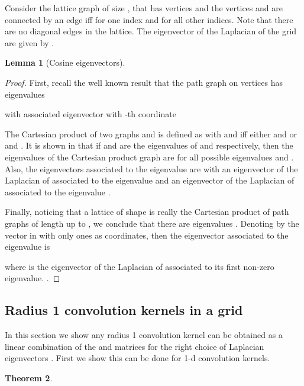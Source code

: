 \documentclass{article} \usepackage{arxiv,times}
\newtheorem{theorem}{Theorem}[section]
\newtheorem{lemma}[theorem]{Lemma}
\begin{document}
Consider the lattice graph  of size , that has vertices  and the vertices  and  are connected by an edge iff  for one index  and  for all other indices. Note that there are no diagonal edges in the lattice. The eigenvector of the Laplacian of the grid  are given by .

\begin{lemma}[Cosine eigenvectors]
\label{lemma:cosine_eigvec}
\end{lemma}


\begin{proof}
First, recall the well known result that the path graph on  vertices  has eigenvalues 

with associated eigenvector  with -th coordinate


The Cartesian product of two graphs  and  is defined as  with  and  iff either  and  or  and . It is shown in \cite{fiedler1973algebraic} that if  and  are the eigenvalues of  and  respectively, then the eigenvalues of the Cartesian product graph  are  for all possible eigenvalues  and . Also, the eigenvectors associated to the eigenvalue  are  with  an eigenvector of the Laplacian of  associated to the eigenvalue  and  an eigenvector of the Laplacian of  associated to the eigenvalue . 

Finally, noticing that a lattice of shape  is really the Cartesian product of path graphs of length  up to , we conclude that there are eigenvalues . Denoting by  the vector in  with only ones as coordinates, then the eigenvector associated to the eigenvalue  is 

where  is the eigenvector of the Laplacian of  associated to its first non-zero eigenvalue. .
\end{proof}


\subsection{Radius 1 convolution kernels in a grid}
In this section we show any radius 1 convolution kernel can be obtained as a linear combination of the  and  matrices for the right choice of Laplacian eigenvectors . First we show this can be done for 1-d convolution kernels.


\begin{theorem}\label{th:1D_convolution_kernel}
\end{theorem}
\end{document}
